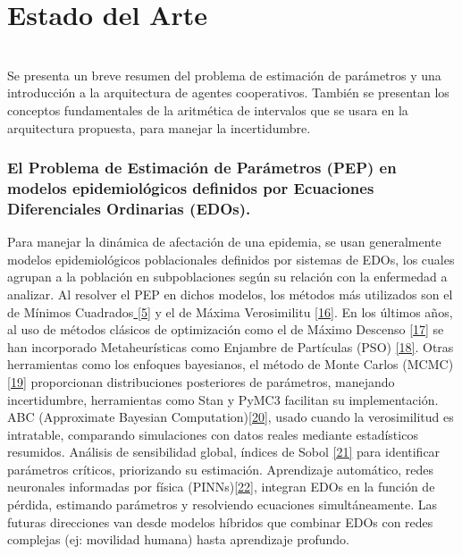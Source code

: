 
\chapter{Estado del Arte}\label{chapter:state-of-the-art}
\label{sec:13} \\

Se presenta un breve resumen del problema de estimación de parámetros y una introducción a la arquitectura de agentes cooperativos. También se presentan los conceptos fundamentales de la aritmética de intervalos que se usara en la arquitectura propuesta, para manejar la incertidumbre.

    \subsection*{ El Problema de Estimación de Parámetros (PEP) en modelos epidemiológicos definidos por Ecuaciones Diferenciales Ordinarias (EDOs).}

    Para manejar la dinámica de afectación de una epidemia, se usan generalmente modelos epidemiológicos poblacionales definidos por sistemas de EDOs,
    los cuales agrupan a la población en subpoblaciones según su relación con la enfermedad a analizar. Al resolver el PEP en dichos modelos, los métodos
    más utilizados son el de Mínimos Cuadrados\hyperref[sec:5]{ [5]} y el de Máxima Verosimilitu \hyperref[sec:27]{[16]}. En los últimos años, al uso de métodos clásicos
    de optimización como el de Máximo Descenso \hyperref[sec:27]{[17]} se han incorporado Metaheurísticas como Enjambre de Partículas (PSO) \hyperref[sec:28]{[18]}. Otras herramientas como los enfoques bayesianos, el método de Monte
    Carlos (MCMC) \hyperref[sec:29]{[19]} proporcionan distribuciones posteriores de parámetros, manejando incertidumbre, herramientas como Stan y PyMC3 facilitan su implementación.
    ABC (Approximate Bayesian Computation)\hyperref[sec:30]{[20]}, usado cuando la verosimilitud es intratable, comparando simulaciones con datos reales mediante estadísticos resumidos.
    Análisis de sensibilidad global, índices de Sobol \hyperref[sec:31]{[21]} para identificar parámetros críticos, priorizando su estimación. Aprendizaje automático, redes neuronales
    informadas por física (PINNs)\hyperref[sec:32]{[22]}, integran EDOs en la función de pérdida, estimando parámetros y resolviendo ecuaciones simultáneamente. Las futuras direcciones van desde modelos híbridos que combinar EDOs con redes
    complejas (ej: movilidad humana) hasta aprendizaje profundo.

